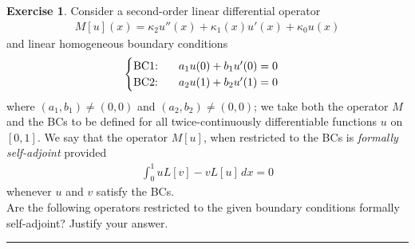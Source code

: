 \documentclass{article}
\theoremstyle{definition}
\newtheorem*{exer*}{Exercise}
\begin{document}
\begin{exer*}
	Consider a second-order linear differential operator
	\begin{align*}
	M[u](x) = \kappa_2 u''(x) + \kappa_1(x)u'(x) + \kappa_0 u(x)
	\end{align*}
	and linear homogeneous boundary conditions 
	\begin{align*}
	\begin{cases}
	\text{BC1: }\hspace{0.5cm} a_1u(0) + b_1u'(0) = 0\\
	\text{BC2: }\hspace{0.5cm} a_2u(1) + b_2 u'(1) = 0
	\end{cases}
	\end{align*}
	where $(a_1,b_1) \neq (0,0)$ and $(a_2,b_2) \neq (0,0)$; we take both the operator $M$ and the BCs to be defined for all twice-continuously differentiable functions $u$ on $[0,1]$. We say that the operator $M[u]$, when restricted to the BCs is \textit{formally self-adjoint} provided
	\begin{align*}
	\int^1_0 uL[v] - vL[u]\,dx = 0
	\end{align*}
	whenever $u$ and $v$ satisfy the BCs. \\
	
	Are the following operators restricted to the given boundary conditions formally self-adjoint? Justify your
	answer.

	
	\noindent\rule{\textwidth}{0.5pt}
	

\end{exer*}
\end{document}

